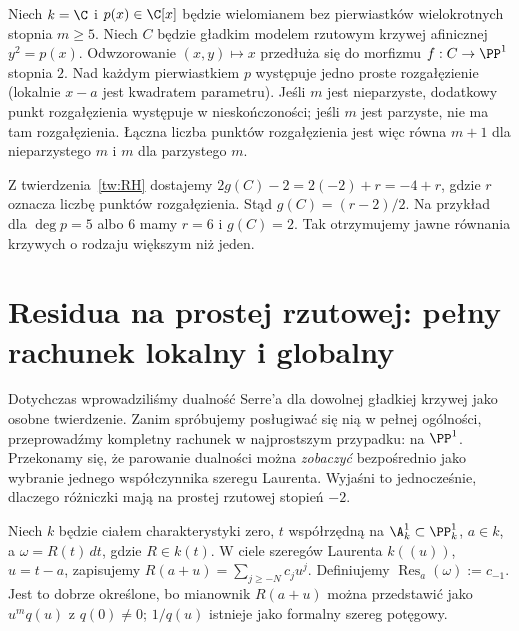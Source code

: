 \begin{przyklad}
Niech $k=\C$ i $p(x)\in\C[x]$ będzie wielomianem
bez pierwiastków wielokrotnych stopnia $m\ge5$.
Niech $C$ będzie gładkim modelem rzutowym
krzywej afinicznej $y^2=p(x)$.
Odwzorowanie $(x,y)\mapsto x$ przedłuża się
do morfizmu $f:C\to\PP^1$ stopnia $2$.
Nad każdym pierwiastkiem $p$ występuje jedno
proste rozgałęzienie (lokalnie $x-a$ jest
kwadratem parametru). Jeśli $m$ jest nieparzyste,
dodatkowy punkt rozgałęzienia występuje
w nieskończoności; jeśli $m$ jest parzyste,
nie ma tam rozgałęzienia. Łączna liczba punktów
rozgałęzienia jest więc równa $m+1$ dla
nieparzystego $m$ i $m$ dla parzystego $m$.

Z twierdzenia~\ref{tw:RH} dostajemy
$2g(C)-2=2(-2)+r=-4+r$, gdzie $r$ oznacza
liczbę punktów rozgałęzienia. Stąd
$g(C)=(r-2)/2$.
Na przykład dla $\deg p=5$ albo $6$ mamy
$r=6$ i $g(C)=2$.
Tak otrzymujemy jawne równania krzywych o rodzaju
większym niż jeden.
\end{przyklad}


\section{Residua na prostej rzutowej: pełny rachunek lokalny i globalny}
\label{sec:residua-p1}

Dotychczas wprowadziliśmy dualność Serre'a dla dowolnej gładkiej
krzywej jako osobne twierdzenie. Zanim spróbujemy posługiwać się nią
w pełnej ogólności, przeprowadźmy kompletny rachunek w najprostszym
przypadku: na $\PP^1$. Przekonamy się, że parowanie dualności można
\emph{zobaczyć} bezpośrednio jako wybranie jednego współczynnika
szeregu Laurenta. Wyjaśni to jednocześnie, dlaczego różniczki mają
na prostej rzutowej stopień $-2$.

\begin{definicja}
Niech $k$ będzie ciałem charakterystyki zero,
$t$ współrzędną na $\A^1_k\subset\PP^1_k$, $a\in k$,
a $\omega=R(t)\,dt$, gdzie $R\in k(t)$.
W ciele szeregów Laurenta $k((u))$, $u=t-a$, zapisujemy
$R(a+u)=\sum_{j\ge-N}c_j u^j$.
Definiujemy
$\operatorname{Res}_{a}(\omega):=c_{-1}$.
Jest to dobrze określone, bo mianownik $R(a+u)$ można
przedstawić jako $u^m q(u)$ z $q(0)\ne0$;
$1/q(u)$ istnieje jako formalny szereg potęgowy.
\end{definicja}

